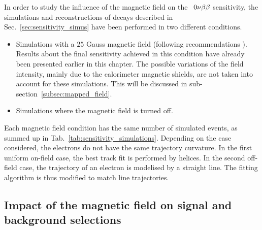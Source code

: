 In order to study the influence of the magnetic field on the \Se\ $0\nu\beta\beta$ sensitivity, the simulations and reconstructions of decays described in Sec.~\ref{sec:sensitivity_simus} have been performed in two different conditions.
\begin{itemize}
\item Simulations with a $25$ Gauss magnetic field (following recommendations \cite{CalvezThesis}).
  Results about the final sensitivity achieved in this condition have already been presented earlier in this chapter.
  The possible variations of the field intensity, mainly due to the calorimeter magnetic shields, are not taken into account for these simulations.
  This will be discussed in sub-section~\ref{subsec:mapped_field}.
\item Simulations where the magnetic field is turned off.
\end{itemize}
Each magnetic field condition has the same number of simulated events, as summed up in Tab.~\ref{tab:sensitivity_simulations}.
Depending on the case considered, the electrons do not have the same trajectory curvature.
In the first uniform on-field case, the best track fit is performed by helices.
In the second off-field case, the trajectory of an electron is modelised by a straight line.
The fitting algorithm is thus modified to match line trajectories.

\subsection{Impact of the magnetic field on signal and background selections}

